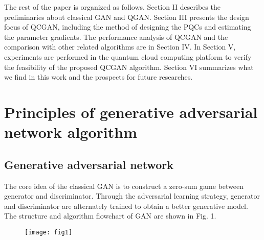 \documentclass{bmcart}
\begin{document}
The rest of the paper is organized as follows. Section II describes the preliminaries about classical GAN and QGAN. Section III presents the design focus of QCGAN, including the method of designing the PQCs and estimating the parameter gradients. The performance analysis of QCGAN and the comparison with other related algorithms are in Section IV. In Section V, experiments are performed in the quantum cloud computing platform to verify the feasibility of the proposed QCGAN algorithm. Section VI summarizes what we find in this work and the prospects for future researches.

\section{Principles of generative adversarial network algorithm}


\subsection{Generative adversarial network}
The core idea of the classical GAN is to construct a zero-sum game between generator and discriminator. Through the adversarial learning strategy, generator and discriminator are alternately trained to obtain a better generative model. The structure and algorithm flowchart of GAN are shown in Fig. 1.

  \begin{figure}[h!]
  \texttt{[image: fig1]}
  \caption{}
      \end{figure}
\end{document}
